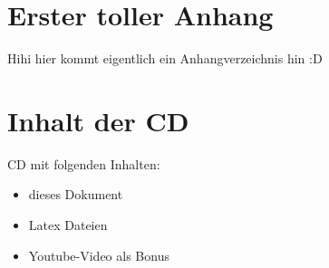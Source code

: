 
\clearpage
\appendix
\clearpage

\section{Erster toller Anhang}
Hihi hier kommt eigentlich ein Anhangverzeichnis hin :D
\newpage

\section{Inhalt der CD}
CD mit folgenden Inhalten:
\begin{itemize}
	\item dieses Dokument
	\item Latex Dateien
	\item Youtube-Video als Bonus
\end{itemize}
 \newpage


